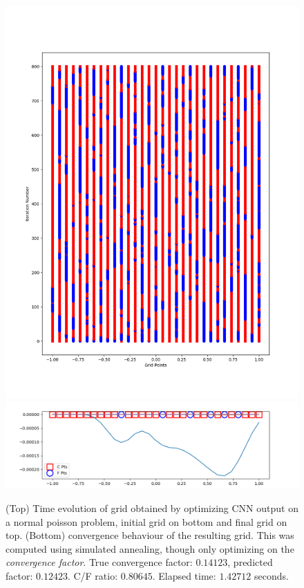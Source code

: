 \begin{figure}[h]
  \centering
  \includegraphics[scale=0.5]{figures/grid-opt/poisson_unitary_grid_time_conv_only.png}
  \includegraphics[scale=0.5]{figures/grid-opt/poisson_unitary_grid_conv_conv_only.png}
  \caption{(Top) Time evolution of grid obtained by optimizing CNN output on a normal poisson problem, initial grid on bottom and final grid on top.  (Bottom) convergence behaviour of the resulting grid.  This was computed using simulated annealing, though only optimizing on the \textit{convergence factor}.  True convergence factor: $0.14123$, predicted factor: $0.12423$.  C/F ratio: $0.80645$.  Elapsed time: $1.42712$ seconds.  }
  \label{fig:optimized_grid_poisson_conv}
\end{figure}

